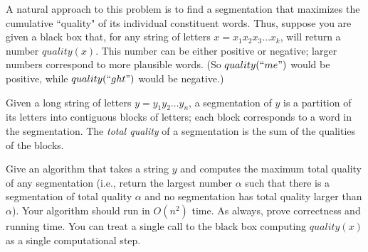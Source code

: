 \documentclass{article}
\begin{document}
A natural approach to this problem is to find a segmentation that maximizes the cumulative ``quality"  of its individual constituent words.  Thus, suppose you are given a black box that, for any string of letters $x = x_1 x_2 x_3 \dots x_k$, will return a number $quality(x)$.  This number can be either positive or negative; larger numbers correspond to more plausible words.  (So $quality(``me")$ would be positive, while $quality(``ght")$ would be negative.)

Given a long string of letters $y = y_1 y_2 \dots y_n$, a segmentation of $y$ is a partition of its letters into contiguous blocks of letters; each block corresponds to a word in the segmentation.  The \emph{total quality} of a segmentation is the sum of the qualities of the blocks.  

Give an algorithm that takes a string $y$ and computes the maximum total quality of any segmentation (i.e., return the largest number $\alpha$ such that there is a segmentation of total quality $\alpha$ and no segmentation has total quality larger than $\alpha$).  Your algorithm should run in $O(n^2)$ time.  As always, prove correctness and running time.  You can treat a single call to the black box computing $quality(x)$ as a single computational step.  
\end{document}
